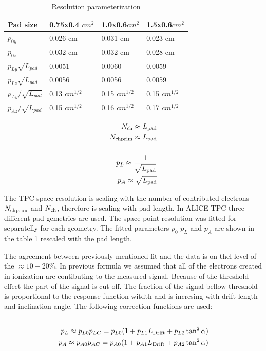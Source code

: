 \documentclass[a4paper,12pt]{article}
\begin{document}
\begin{table}
\caption{Resolution parameterization}
\begin{tabular}{|l|l|l|l|} \hline
Pad size 		& 0.75x0.4 $cm^2$ 	& 1.0x0.6$cm^2$ & 1.5x0.6$cm^2$  \\  \hline
$p_{0y}$                & 0.026  cm       	& 0.031  cm     & 0.023 cm       \\  \hline
$p_{0z}$                & 0.032  cm       	& 0.032  cm     & 0.028 cm       \\  \hline
$p_{Ly}\sqrt{L_{pad}}$  & 0.0051                & 0.0060        & 0.0059         \\  \hline 
$p_{Lz}\sqrt{L_{pad}}$  & 0.0056                & 0.0056        & 0.0059         \\  \hline 
$p_{Ay}/\sqrt{L_{pad}}$ & 0.13 $cm^{1/2}$      & 0.15 $cm^{1/2}$          & 0.15 $cm^{1/2}$           \\  \hline 
$p_{Az}/\sqrt{L_{pad}}$ & 0.15 $cm^{1/2}$               & 0.16 $cm^{1/2}$          & 0.17 $cm^{1/2}$         \\  \hline 

\end{tabular}
\label{table:PointResolFitParam}
\end{table}


\begin{eqnarray}\
     N_{\rm{ch}} \approx {L_{\rm{pad}}} \nonumber \\
     N_{\rm{chprim}} \approx {L_{\rm{pad}}} \nonumber \\	
     \nonumber\\
     p_L \approx \frac{1}{\sqrt{L_{\rm{pad}}}}
     \nonumber\\
     p_A \approx \sqrt{L_{\rm{pad}}}
\label{eq:ResolScaling}	
\end{eqnarray}


The TPC space resolution is scaling with the number of contributed electrons 
$N_{\rm{chprim}}$ and ${N_{\rm{ch}}}$, therefore is scaling with pad length.
In ALICE TPC three different pad gemetries are used. 
The space point resolution was fitted for separatelly for each geometry. The fitted parameters $p_0$ $p_L$ and $p_A$ are shown in the table \ref{table:PointResolFitParam} rescaled with the pad length.


The agreement between  previously mentioned fit and the data is on thel level of the
$\approx10-20\%$. In previous formula we assumed that all of the electrons created in ionization are contibuting to the measured signal. Because of the threshold effect the
part of the signal is cut-off. The fraction of the signal bellow threshold is proportional to the response function witdth and is incresing with drift length and inclination angle. The following correction functions are used: 
\begin{eqnarray}\
     \nonumber\\
     p_L \approx p_{L0}p_{LC}=p_{L0}(1+p_{L1}L_{\rm{Drift}}+p_{L2}\tan^2\alpha)
     \nonumber\\
     p_A \approx p_{A0}p_{AC}=p_{A0}(1+p_{A1}L_{\rm{Drift}}+p_{A2}\tan^2\alpha)
\label{eq:PointResolFitCorrection}
\end{eqnarray}
\end{document}
